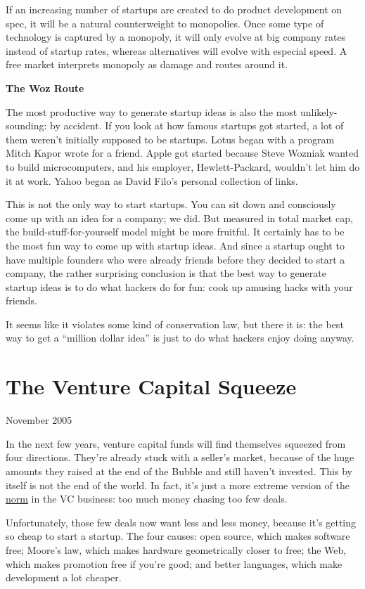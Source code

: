 \documentclass[12pt]{book}
\begin{document}
If an increasing number of startups are created to do product
development on spec, it will be a natural counterweight to monopolies.
Once some type of technology is captured by a monopoly, it will only
evolve at big company rates instead of startup rates, whereas
alternatives will evolve with especial speed. A free market interprets
monopoly as damage and routes around it.

\textbf{The Woz Route}

The most productive way to generate startup ideas is also the most
unlikely-sounding: by accident. If you look at how famous startups got
started, a lot of them weren't initially supposed to be startups. Lotus
began with a program Mitch Kapor wrote for a friend. Apple got started
because Steve Wozniak wanted to build microcomputers, and his employer,
Hewlett-Packard, wouldn't let him do it at work. Yahoo began as David
Filo's personal collection of links.

This is not the only way to start startups. You can sit down and
consciously come up with an idea for a company; we did. But measured in
total market cap, the build-stuff-for-yourself model might be more
fruitful. It certainly has to be the most fun way to come up with
startup ideas. And since a startup ought to have multiple founders who
were already friends before they decided to start a company, the rather
surprising conclusion is that the best way to generate startup ideas is
to do what hackers do for fun: cook up amusing hacks with your friends.

It seems like it violates some kind of conservation law, but there it
is: the best way to get a ``million dollar idea'' is just to do what
hackers enjoy doing anyway.
\chapter{The Venture Capital Squeeze}

November 2005

In the next few years, venture capital funds will find themselves
squeezed from four directions. They're already stuck with a seller's
market, because of the huge amounts they raised at the end of the Bubble
and still haven't invested. This by itself is not the end of the world.
In fact, it's just a more extreme version of the
\href{http://www.archub.org/dilbertvc.gif}{norm} in the VC business: too
much money chasing too few deals.

Unfortunately, those few deals now want less and less money, because
it's getting so cheap to start a startup. The four causes: open source,
which makes software free; Moore's law, which makes hardware
geometrically closer to free; the Web, which makes promotion free if
you're good; and better languages, which make development a lot cheaper.
\end{document}
